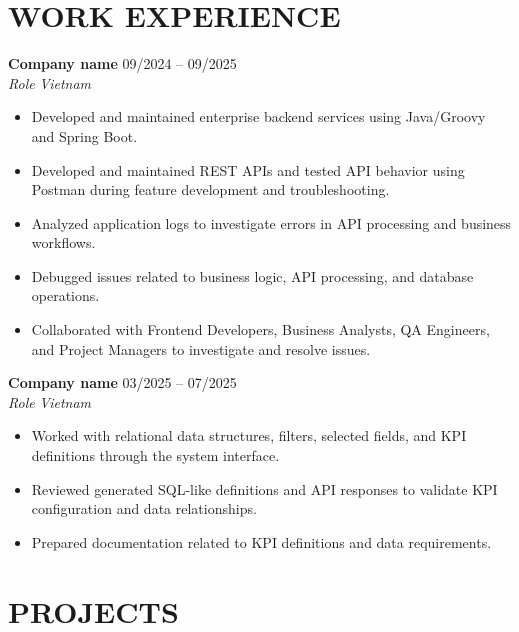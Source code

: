 \documentclass[10pt,a4paper]{article}
\newcommand{\cvjob}[4]{
    \textbf{#1} \hfill #2\\
    \textit{#3} \hfill \textit{#4}
}
\begin{document}
\section{WORK EXPERIENCE}

\cvjob
{Company name}
{09/2024 -- 09/2025}
{Role}
{Vietnam}

\begin{itemize}
    \item Developed and maintained enterprise backend services using
    Java/Groovy and Spring Boot.

    \item Developed and maintained REST APIs and tested API behavior
    using Postman during feature development and troubleshooting.

    \item Analyzed application logs to investigate errors in API processing
    and business workflows.

    \item Debugged issues related to business logic, API processing,
    and database operations.

    \item Collaborated with Frontend Developers, Business Analysts,
    QA Engineers, and Project Managers to investigate and resolve issues.
\end{itemize}

\vspace{2pt}

\cvjob
{Company name}
{03/2025 -- 07/2025}
{Role}
{Vietnam}

\begin{itemize}

    \item Worked with relational data structures, filters, selected
    fields, and KPI definitions through the system interface.

    \item Reviewed generated SQL-like definitions and API responses
    to validate KPI configuration and data relationships.

    \item Prepared documentation related to KPI definitions and
    data requirements.
\end{itemize}


\section{PROJECTS}
\end{document}
